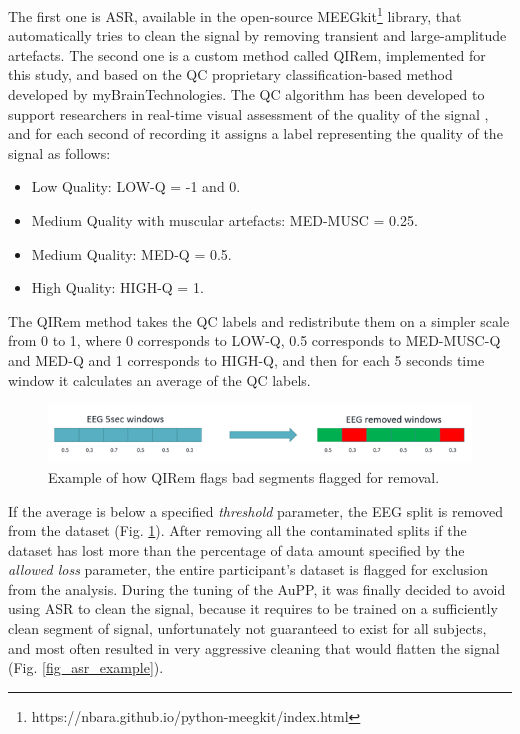 The first one is  \ac{ASR}, available in the open-source MEEGkit\footnote{https://nbara.github.io/python-meegkit/index.html}  library, that automatically tries to clean the signal by removing transient and large-amplitude artefacts. The second one is a custom method called \ac{QIRem}, implemented for this study, and based on the \ac{QC} proprietary classification-based method developed by myBrainTechnologies. The \ac{QC} algorithm has been developed to support researchers in real-time visual assessment of the quality of the signal \cite{grosselin_quality_2019}, and for each second of recording it assigns a label representing the quality of the signal as follows:
\begin{itemize}
\item 	Low Quality: LOW-Q = -1 and 0. 
\item 	Medium Quality with muscular artefacts: MED-MUSC = 0.25. 
\item 	Medium Quality: MED-Q = 0.5. 
\item     High Quality: HIGH-Q = 1.
\end{itemize}

The \ac{QIRem} method takes the \ac{QC} labels and redistribute them on a simpler scale from 0 to 1, where 0 corresponds to LOW-Q, 0.5 corresponds to MED-MUSC-Q and MED-Q and 1 corresponds to HIGH-Q, and then for each 5 seconds time window it calculates an average of the \ac{QC} labels.

\begin{figure}[h!]
\includegraphics[width=15cm]{img/methods/qirem_example.png}
\centering
\caption{Example of how QIRem flags bad segments flagged for removal.} \label{fig_qirem_example}
\end{figure}

If the average is below a specified \emph{threshold} parameter, the EEG split is removed from the dataset (Fig. \ref{fig_qirem_example}). After removing all the contaminated splits if the dataset has lost more than the percentage of data  amount specified by the \emph{allowed loss} parameter, the entire participant’s dataset is flagged for exclusion from the analysis. During the tuning of the \ac{AuPP}, it was finally decided to avoid using \ac{ASR} to clean the signal, because it requires to be trained on a sufficiently clean segment of signal, unfortunately not guaranteed to exist for all subjects, and most often resulted in very aggressive cleaning that would flatten the signal (Fig. \ref{fig_asr_example}).

